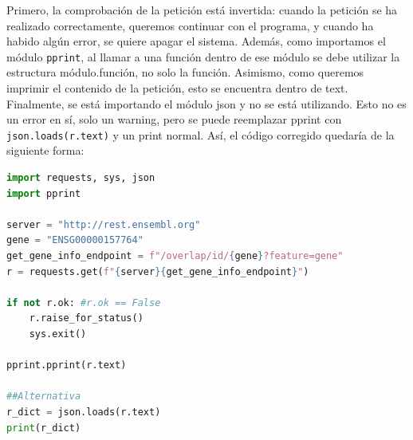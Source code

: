 Primero, la comprobación de la petición está invertida: cuando la petición se ha realizado correctamente, queremos continuar con el programa, y cuando ha habido algún error, se quiere apagar el sistema. Además, como importamos el módulo \texttt{pprint}, al llamar a una función dentro de ese módulo se debe utilizar la estructura módulo.función, no solo la función. Asimismo, como queremos imprimir el contenido de la petición, esto se encuentra dentro de text. Finalmente, se está importando el módulo json y no se está utilizando. Esto no es un error en sí, solo un warning, pero se puede reemplazar pprint con \texttt{json.loads(r.text)} y un print normal. Así, el código corregido quedaría de la siguiente forma:
\begin{lstlisting}[language=Python]
import requests, sys, json
import pprint

server = "http://rest.ensembl.org"
gene = "ENSG00000157764"
get_gene_info_endpoint = f"/overlap/id/{gene}?feature=gene"
r = requests.get(f"{server}{get_gene_info_endpoint}")

if not r.ok: #r.ok == False
	r.raise_for_status()
	sys.exit()

pprint.pprint(r.text)

##Alternativa
r_dict = json.loads(r.text)
print(r_dict)
\end{lstlisting}